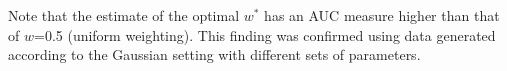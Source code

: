 \documentclass[12pt]{article} %
\begin{document}

Note that   the estimate of the optimal $w^{*}$  has  an AUC measure higher than  that of $w$=0.5 (uniform weighting). This finding was confirmed using data generated 
according to  the Gaussian setting with different sets of parameters.
\end{document}
